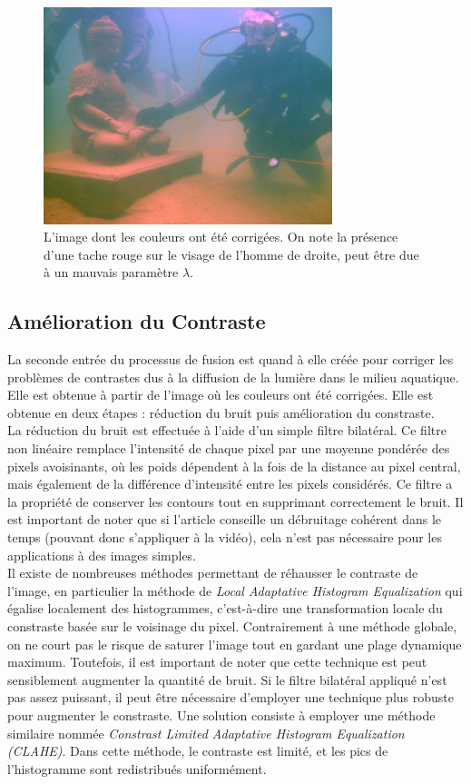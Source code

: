 \documentclass[twoside]{article}
\begin{document}
\begin{figure}[H]
  \centering
  \includegraphics[width=0.75\textwidth]{Support/color.png}
  \caption{L'image dont les couleurs ont été corrigées. On note la présence d'une tache rouge sur le visage de l'homme de droite, peut être due à un mauvais paramètre $\lambda$.}
\end{figure}

\subsection{Amélioration du Contraste}
La seconde entrée du processus de fusion est quand à elle créée pour corriger les problèmes de contrastes dus à la diffusion de la lumière dans le milieu aquatique. Elle est obtenue à partir de l'image où les couleurs ont été corrigées. Elle est obtenue en deux étapes : réduction du bruit puis amélioration du constraste.\\
La réduction du bruit est effectuée à l'aide d'un simple filtre bilatéral. Ce filtre non linéaire remplace l'intensité de chaque pixel par une moyenne pondérée des pixels avoisinants, où les poids dépendent à la fois de la distance au pixel central, mais également de la différence d'intensité entre les pixels considérés. Ce filtre a la propriété de conserver les contours tout en supprimant correctement le bruit. Il est important de noter que si l'article conseille un débruitage cohérent dans le temps (pouvant donc s'appliquer à la vidéo), cela n'est pas nécessaire pour les applications à des images simples.\\
Il existe de nombreuses méthodes permettant de réhausser le contraste de l'image, en particulier la méthode de \emph{Local Adaptative Histogram Equalization} qui égalise localement des histogrammes, c'est-à-dire une transformation locale du constraste basée sur le voisinage du pixel. Contrairement à une méthode globale, on ne court pas le risque de saturer l'image tout en gardant une plage dynamique maximum. Toutefois, il est important de noter que cette technique est peut sensiblement augmenter la quantité de bruit. Si le filtre bilatéral appliqué n'est pas assez puissant, il peut être nécessaire d'employer une technique plus robuste pour augmenter le constraste. Une solution consiste à employer une méthode similaire nommée \emph{Constrast Limited Adaptative Histogram Equalization (CLAHE)}. Dans cette méthode, le contraste est limité, et les pics de l'histogramme sont redistribués uniformément.
\end{document}
